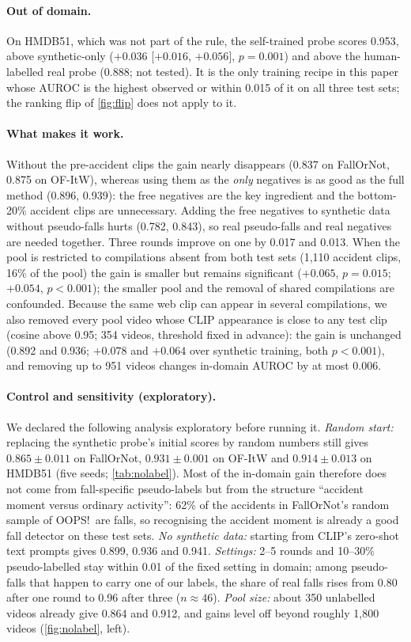 \documentclass[10pt,twocolumn,letterpaper]{article}
\begin{document}
\paragraph{Out of domain.} On HMDB51, which was not part of the rule, the self-trained probe scores 0.953, above synthetic-only ($+0.036$ [$+0.016$, $+0.056$], $p=0.001$) and above the human-labelled real probe (0.888; not tested). It is the only training recipe in this paper whose AUROC is the highest observed or within 0.015 of it on all three test sets; the ranking flip of \cref{fig:flip} does not apply to it.

\paragraph{What makes it work.} Without the pre-accident clips the gain nearly disappears (0.837 on FallOrNot, 0.875 on OF-ItW), whereas using them as the \emph{only} negatives is as good as the full method (0.896, 0.939): the free negatives are the key ingredient and the bottom-20\% accident clips are unnecessary. Adding the free negatives to synthetic data without pseudo-falls hurts (0.782, 0.843), so real pseudo-falls and real negatives are needed together. Three rounds improve on one by 0.017 and 0.013. When the pool is restricted to compilations absent from both test sets (1,110 accident clips, 16\% of the pool) the gain is smaller but remains significant ($+0.065$, $p=0.015$; $+0.054$, $p<0.001$); the smaller pool and the removal of shared compilations are confounded. Because the same web clip can appear in several compilations, we also removed every pool video whose CLIP appearance is close to any test clip (cosine above 0.95; 354 videos, threshold fixed in advance): the gain is unchanged (0.892 and 0.936; $+0.078$ and $+0.064$ over synthetic training, both $p<0.001$), and removing up to 951 videos changes in-domain AUROC by at most 0.006.

\paragraph{Control and sensitivity (exploratory).} We declared the following analysis exploratory before running it. \emph{Random start:} replacing the synthetic probe's initial scores by random numbers still gives $0.865\pm0.011$ on FallOrNot, $0.931\pm0.001$ on OF-ItW and $0.914\pm0.013$ on HMDB51 (five seeds; \cref{tab:nolabel}). Most of the in-domain gain therefore does not come from fall-specific pseudo-labels but from the structure ``accident moment versus ordinary activity'': 62\% of the accidents in FallOrNot's random sample of OOPS!\ are falls, so recognising the accident moment is already a good fall detector on these test sets. \emph{No synthetic data:} starting from CLIP's zero-shot text prompts gives 0.899, 0.936 and 0.941. \emph{Settings:} 2--5 rounds and 10--30\% pseudo-labelled stay within 0.01 of the fixed setting in domain; among pseudo-falls that happen to carry one of our labels, the share of real falls rises from 0.80 after one round to 0.96 after three ($n\approx46$). \emph{Pool size:} about 350 unlabelled videos already give 0.864 and 0.912, and gains level off beyond roughly 1,800 videos (\cref{fig:nolabel}, left).
\end{document}
